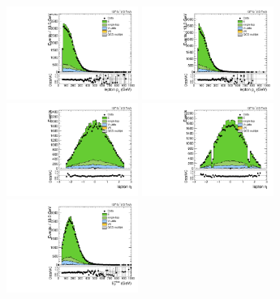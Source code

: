 \begin{figure}[htbp]
  \centering
  \includegraphics[width=0.3825\textwidth]{fig/analysisAppendix/CR_b1_mu_allP_allC_allD_Run2_lnujj_l1_l_pt.pdf}
  \includegraphics[width=0.3825\textwidth]{fig/analysisAppendix/CR_b1_e_allP_allC_allD_Run2_lnujj_l1_l_pt.pdf}\\
  \includegraphics[width=0.3825\textwidth]{fig/analysisAppendix/CR_b1_mu_allP_allC_allD_Run2_lnujj_l1_l_eta.pdf}
  \includegraphics[width=0.3825\textwidth]{fig/analysisAppendix/CR_b1_e_allP_allC_allD_Run2_lnujj_l1_l_eta.pdf}\\
  \includegraphics[width=0.3825\textwidth]{fig/analysisAppendix/CR_b1_mu_allP_allC_allD_Run2_met_pt.pdf}

\end{figure}
